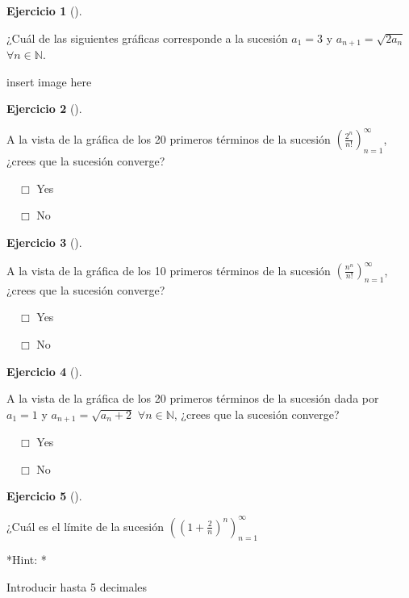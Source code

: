 \documentclass[
  a4paper,
]{scrreport}
\theoremstyle{definition}
\newtheorem{exercise}{Ejercicio}[chapter]
\theoremstyle{remark}
\begin{document}
\begin{exercise}[]\protect\hypertarget{exr-sucesiones-propuesto-3}{}\label{exr-sucesiones-propuesto-3}

¿Cuál de las siguientes gráficas corresponde a la sucesión \(a_1=3\) y
\(a_{n+1}=\sqrt{2a_n}\) \(\forall n\in\mathbb{N}\).

insert image here

\end{exercise}

\begin{exercise}[]\protect\hypertarget{exr-sucesiones-propuesto-4}{}\label{exr-sucesiones-propuesto-4}

A la vista de la gráfica de los 20 primeros términos de la sucesión
\(\left(\frac{2^n}{n!}\right)_{n=1}^\infty\), ¿crees que la sucesión
converge?

${\quad\Box}$ Yes

${\quad\Box}$ No

\end{exercise}

\begin{exercise}[]\protect\hypertarget{exr-sucesiones-propuesto-5}{}\label{exr-sucesiones-propuesto-5}

A la vista de la gráfica de los 10 primeros términos de la sucesión
\(\left(\frac{n^n}{n!}\right)_{n=1}^\infty\), ¿crees que la sucesión
converge?

${\quad\Box}$ Yes

${\quad\Box}$ No

\end{exercise}

\begin{exercise}[]\protect\hypertarget{exr-sucesiones-propuesto-6}{}\label{exr-sucesiones-propuesto-6}

A la vista de la gráfica de los 20 primeros términos de la sucesión dada
por \(a_1=1\) y \(a_{n+1}=\sqrt{a_n+2}\) \(\forall n\in \mathbb{N}\),
¿crees que la sucesión converge?

${\quad\Box}$ Yes

${\quad\Box}$ No

\end{exercise}

\begin{exercise}[]\protect\hypertarget{exr-sucesiones-propuesto-7}{}\label{exr-sucesiones-propuesto-7}

¿Cuál es el límite de la sucesión
\(\left(\left(1+\frac{2}{n}\right)^n\right)_{n=1}^\infty\)

\vspace{18pt}*Hint: *

Introducir hasta 5 decimales

\end{exercise}
\end{document}

